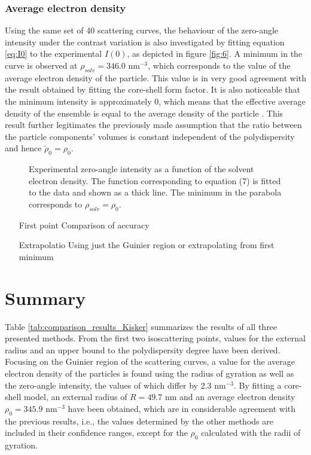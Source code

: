 \subsubsection{Average electron density}
Using the same set of 40 scattering curves, the behaviour of the zero-angle intensity under the contrast variation is also investigated by fitting equation \eqref{eq:I0} to the experimental \(I(0)\), as depicted in figure \ref{fig:6}. A minimum in the curve is observed at \(\rho_{solv}=346.0\) nm\(^{-3}\), which corresponds to the value of the average electron density of the particle. This value is in very good agreement with the result obtained by fitting the core-shell form factor. It is also noticeable that the minimum intensity is approximately 0, which means that the effective average density of the ensemble is equal to the average density of the particle \cite{avdeev_contrast_2007-1}. This result further legitimates the previously made assumption that the ratio between the particle components' volumes is constant independent of the polydispersity and hence \(  \tilde \rho_0 = \rho_0  \).

\begin{figure}%
	\centering
		
		\caption{Experimental zero-angle intensity as a function of the solvent electron density. The function corresponding to equation (7) is fitted to the data and shown as a thick line. The minimum in the parabola corresponds to $\rho_{solv}=\rho_0$.}
		\label{fig:KiskerIntensityParabola}
\end{figure}

\begin{itemize}
	\item [First point] Comparison of accuracy
	\item [Extrapolatio] Using just the Guinier region or extrapolating from first minimum
\end{itemize}

\section{Summary}
Table \ref{tab:comparison_results_Kisker} summarizes the results of all three presented methods. From the first two isoscattering points, values for the external radius and an upper bound to the polydispersity degree have been derived. Focusing on the Guinier region of the scattering curves, a value for the average electron density of the particles is found using the radius of gyration as well as the zero-angle intensity, the values of which differ by 2.3 nm\(^{-3}\). By fitting a core-shell model, an external radius of \(R=49.7\) nm and an average electron density \(\rho_0=345.9\) nm\(^{-3}\) have been obtained, which are in considerable agreement with the previous results, i.e., the values determined by the other methods are included in their confidence ranges, except for the \(\rho_0\) calculated with the radii of gyration.

